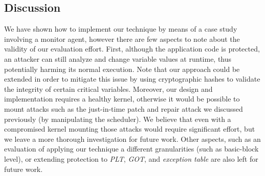\subsection{Discussion}
\label{ssec:discussion}

We have shown how to implement our technique by means of a case study involving 
a monitor agent, however there are few aspects to note about the validity of 
our evaluation effort.
First, although the application code is protected, 
an attacker can still analyze and change variable values at runtime, thus 
potentially harming its normal execution.
Note that our approach could be extended in order to mitigate this issue by 
using cryptographic hashes to validate the integrity of certain critical 
variables.
Moreover, our design and implementation requires a healthy kernel, otherwise it 
would be possible to mount attacks such as the just-in-time patch and repair 
attack we discussed previously (by manipulating the scheduler). We believe  
that even with a compromised kernel mounting those attacks would require 
significant effort, but we leave a more thorough investigation for future work. 
Other aspects, such as an evaluation of applying our technique a different 
granularities (such as basic-block level), or extending protection to 
\emph{PLT}, \emph{GOT}, and \emph{exception table} are also left for future 
work.

